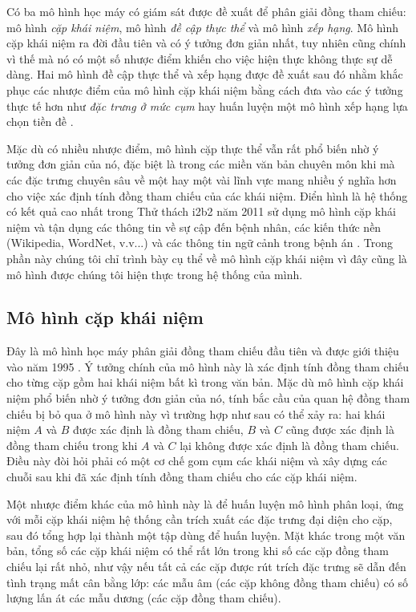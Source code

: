 Có ba mô hình học máy có giám sát được đề xuất để phân giải đồng tham chiếu: mô hình \emph{cặp khái niệm}, mô hình \emph{đề cập thực thể} và mô hình \emph{xếp hạng}. Mô hình cặp khái niệm ra đời đầu tiên và có ý tưởng đơn giản nhất, tuy nhiên cũng chính vì thế mà nó có một số nhược điểm khiến cho việc hiện thực không thực sự dễ dàng. Hai mô hình đề cập thực thể và xếp hạng được đề xuất sau đó nhằm khắc phục các nhược điểm của mô hình cặp khái niệm bằng cách đưa vào các ý tưởng thực tế hơn như \emph{đặc trưng ở mức cụm} \cite{Yang2004} hay huấn luyện một mô hình xếp hạng lựa chọn tiền đề \cite{Yang2003}.

Mặc dù có nhiều nhược điểm, mô hình cặp thực thể vẫn rất phổ biến nhờ ý tưởng đơn giản của nó, đặc biệt là trong các miền văn bản chuyên môn khi mà các đặc trưng chuyên sâu về một hay một vài lĩnh vực mang nhiều ý nghĩa hơn cho việc xác định tính đồng tham chiếu của các khái niệm. Điển hình là hệ thống có kết quả cao nhất trong Thử thách i2b2 năm 2011 sử dụng mô hình cặp khái niệm và tận dụng các thông tin về sự cập đến bệnh nhân, các kiến thức nền (Wikipedia, WordNet, v.v...) và các thông tin ngữ cảnh trong bệnh án \cite{YanXu2012}. Trong phần này chúng tôi chỉ trình bày cụ thể về mô hình cặp khái niệm vì đây cũng là mô hình được chúng tôi hiện thực trong hệ thống của mình.

\subsection*{Mô hình cặp khái niệm}
Đây là mô hình học máy phân giải đồng tham chiếu đầu tiên và được giới thiệu vào năm 1995 \cite{Aone&Bennett1995}. Ý tưởng chính của mô hình này là xác định tính đồng tham chiếu cho từng cặp gồm hai khái niệm bất kì trong văn bản. Mặc dù mô hình cặp khái niệm phổ biến nhờ ý tưởng đơn giản của nó, tính bắc cầu của quan hệ đồng tham chiếu bị bỏ qua ở mô hình này vì trường hợp như sau có thể xảy ra: hai khái niệm $A$ và $B$ được xác định là đồng tham chiếu, $B$ và $C$ cũng được xác định là đồng tham chiếu trong khi $A$ và $C$ lại không được xác định là đồng tham chiếu. Điều này đòi hỏi phải có một cơ chế gom cụm các khái niệm và xây dựng các chuỗi sau khi đã xác định tính đồng tham chiếu cho các cặp khái niệm.

Một nhược điểm khác của mô hình này là để huấn luyện mô hình phân loại, ứng với mỗi cặp khái niệm hệ thống cần trích xuất các đặc trưng đại diện cho cặp, sau đó tổng hợp lại thành một tập dùng để huấn luyện. Mặt khác trong một văn bản, tổng số các cặp khái niệm có thể rất lớn trong khi số các cặp đồng tham chiếu lại rất nhỏ, như vậy nếu tất cả các cặp được rút trích đặc trưng sẽ dẫn đến tình trạng mất cân bằng lớp: các mẫu âm (các cặp không đồng tham chiếu) có số lượng lấn át các mẫu dương (các cặp đồng tham chiếu).

